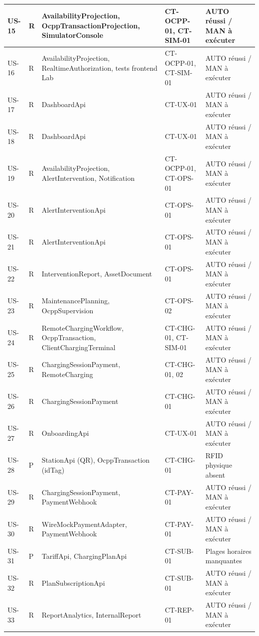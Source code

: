 \begin{longtable}{|C{1.15cm}|C{1.05cm}|L{5.6cm}|L{3.9cm}|L{3.1cm}|}
US-15 & R & AvailabilityProjection, OcppTransactionProjection, SimulatorConsole & CT-OCPP-01, CT-SIM-01 & AUTO réussi / MAN à exécuter \\ \hline
US-16 & R & AvailabilityProjection, RealtimeAuthorization, tests frontend Lab & CT-OCPP-01, CT-SIM-01 & AUTO réussi / MAN à exécuter \\ \hline
US-17 & R & DashboardApi & CT-UX-01 & AUTO réussi / MAN à exécuter \\ \hline
US-18 & R & DashboardApi & CT-UX-01 & AUTO réussi / MAN à exécuter \\ \hline
US-19 & R & AvailabilityProjection, AlertIntervention, Notification & CT-OCPP-01, CT-OPS-01 & AUTO réussi / MAN à exécuter \\ \hline
US-20 & R & AlertInterventionApi & CT-OPS-01 & AUTO réussi / MAN à exécuter \\ \hline
US-21 & R & AlertInterventionApi & CT-OPS-01 & AUTO réussi / MAN à exécuter \\ \hline
US-22 & R & InterventionReport, AssetDocument & CT-OPS-01 & AUTO réussi / MAN à exécuter \\ \hline
US-23 & R & MaintenancePlanning, OcppSupervision & CT-OPS-02 & AUTO réussi / MAN à exécuter \\ \hline
US-24 & R & RemoteChargingWorkflow, OcppTransaction, ClientChargingTerminal & CT-CHG-01, CT-SIM-01 & AUTO réussi / MAN à exécuter \\ \hline
US-25 & R & ChargingSessionPayment, RemoteCharging & CT-CHG-01, 02 & AUTO réussi / MAN à exécuter \\ \hline
US-26 & R & ChargingSessionPayment & CT-CHG-01 & AUTO réussi / MAN à exécuter \\ \hline
US-27 & R & OnboardingApi & CT-UX-01 & AUTO réussi / MAN à exécuter \\ \hline
US-28 & P & StationApi (QR), OcppTransaction (idTag) & CT-CHG-01 & RFID physique absent \\ \hline
US-29 & R & ChargingSessionPayment, PaymentWebhook & CT-PAY-01 & AUTO réussi / MAN à exécuter \\ \hline
US-30 & R & WireMockPaymentAdapter, PaymentWebhook & CT-PAY-01 & AUTO réussi / MAN à exécuter \\ \hline
US-31 & P & TariffApi, ChargingPlanApi & CT-SUB-01 & Plages horaires manquantes \\ \hline
US-32 & R & PlanSubscriptionApi & CT-SUB-01 & AUTO réussi / MAN à exécuter \\ \hline
US-33 & R & ReportAnalytics, InternalReport & CT-REP-01 & AUTO réussi / MAN à exécuter \\ \hline

\end{longtable}
